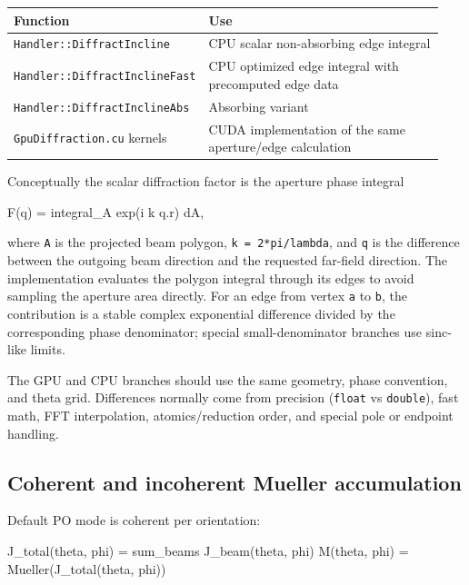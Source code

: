 \documentclass[
  10pt,
  a4paper,
]{article}
\newenvironment{Shaded}{}{}
\newcommand{\NormalTok}[1]{#1}
\begin{document}
\begin{longtable}[]{@{}L{0.30\linewidth}L{0.64\linewidth}@{}}
\toprule\noalign{}
Function & Use \\
\midrule\noalign{}
\endhead
\bottomrule\noalign{}
\endlastfoot
\nolinkurl{Handler::DiffractIncline} & CPU scalar non-absorbing edge
integral \\
\nolinkurl{Handler::DiffractInclineFast} & CPU optimized edge integral with
precomputed edge data \\
\nolinkurl{Handler::DiffractInclineAbs} & Absorbing variant \\
\texttt{GpuDiffraction.cu} kernels & CUDA implementation of the same
aperture/edge calculation \\
\end{longtable}

Conceptually the scalar diffraction factor is the aperture phase
integral

\begin{Shaded}
\begin{Highlighting}[]
\NormalTok{F(q) = integral\_A exp(i k q.r) dA,}
\end{Highlighting}
\end{Shaded}

where \texttt{A} is the projected beam polygon,
\texttt{k\ =\ 2*pi/lambda}, and \texttt{q} is the difference between the
outgoing beam direction and the requested far-field direction. The
implementation evaluates the polygon integral through its edges to avoid
sampling the aperture area directly. For an edge from vertex \texttt{a}
to \texttt{b}, the contribution is a stable complex exponential
difference divided by the corresponding phase denominator; special
small-denominator branches use sinc-like limits.

The GPU and CPU branches should use the same geometry, phase convention,
and theta grid. Differences normally come from precision (\texttt{float}
vs \texttt{double}), fast math, FFT interpolation, atomics/reduction
order, and special pole or endpoint handling.

\subsection{Coherent and incoherent Mueller
accumulation}\label{coherent-and-incoherent-mueller-accumulation}

Default PO mode is coherent per orientation:

\begin{Shaded}
\begin{Highlighting}[]
\NormalTok{J\_total(theta, phi) = sum\_beams J\_beam(theta, phi)}
\NormalTok{M(theta, phi)       = Mueller(J\_total(theta, phi))}
\end{Highlighting}
\end{Shaded}
\end{document}
